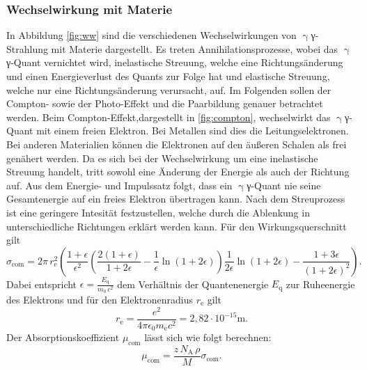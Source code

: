 \subsubsection{Wechselwirkung mit Materie}
In Abbildung \ref{fig:ww} sind die verschiedenen Wechselwirkungen von $\upgamma${γ}-Strahlung mit Materie dargestellt. Es treten Annihilationsprozesse, wobei das $\upgamma${γ}-Quant vernichtet wird, inelastische Streuung, welche eine Richtungsänderung und einen Energieverlust des Quants zur Folge hat und elastische Streuung, welche nur eine Richtungsänderung verursacht, auf.
Im Folgenden sollen der Compton- sowie der Photo-Effekt und die Paarbildung genauer betrachtet werden.
Beim Compton-Effekt,dargestellt in \ref{fig:compton}, wechselwirkt das $\upgamma${γ}-Quant mit einem freien Elektron. Bei Metallen sind dies die Leitungselektronen. Bei anderen Materialien können die Elektronen auf den äußeren Schalen als frei genähert werden. Da es sich bei der Wechselwirkung um eine inelastische Streuung handelt, tritt sowohl eine Änderung der Energie als auch der Richtung auf. Aus dem Energie- und Impulssatz folgt, dass ein $\upgamma${γ}-Quant nie seine Gesamtenergie auf ein freies Elektron übertragen kann. Nach dem Streuprozess ist eine geringere Intesität festzustellen, welche durch die Ablenkung in unterschiedliche Richtungen erklärt werden kann. Für den Wirkungsquerschnitt gilt
\begin{equation}
\label{eqn:sigma_com}
\sigma_\mathrm{com}=2\pi\,r_\mathrm{e}^2\left(\frac{1+\epsilon}{\epsilon^2}\left(\frac{2(1+\epsilon)}{1+2\epsilon}-\frac{1}{\epsilon}\ln(1+2\epsilon) \right)\frac{1}{2\epsilon}\ln(1+2\epsilon)-\frac{1+3\epsilon}{(1+2\epsilon)^2}\right).
\end{equation}
Dabei entspricht $\epsilon = \frac{E_\mathrm{q}}{m_0\,c^2}$ dem Verhältnis der Quantenenergie $E_\mathrm{q}$ zur Ruheenergie des Elektrons und für den Elektronenradius $r_\mathrm{e}$ gilt
\begin{equation}
\label{eqn:r_e}
 r_\mathrm{e}=\frac{e^2}{4\pi\epsilon_0 m_\mathrm{e}c^2}=2,82\cdot10^{-15}\si{\meter}.
\end{equation}
Der Absorptionskoeffizient $\mu_\mathrm{com}$ lässt sich wie folgt berechnen:
\begin{equation}
  \label{eqn:mu_com}
\mu_\mathrm{com}=\frac{z\,N_\mathrm{A}\,\rho}{M}\sigma_\mathrm{com}.
\end{equation}

